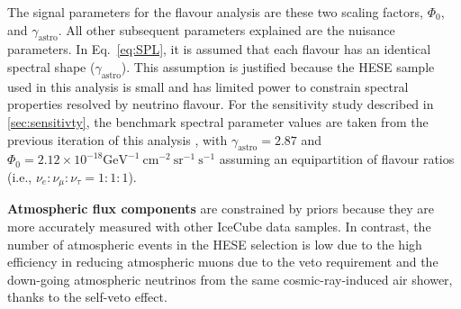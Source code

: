 The signal parameters for the flavour analysis are these two scaling factors, $\Phi_{\mathrm{0}}$, and $\gamma_{\mathrm{astro}}$. All other subsequent parameters explained are the nuisance parameters. In Eq.~\ref{eq:SPL}, it is assumed that each flavour has an identical spectral shape ($\gamma_{\mathrm{astro}}$). This assumption is justified because the HESE sample used in this analysis is small and has limited power to constrain spectral properties resolved by neutrino flavour. For the sensitivity study described in \ref{sec:sensitivty}, the benchmark spectral parameter values are taken from the previous iteration of this analysis , with $\gamma_{\mathrm{astro}} = 2.87$ and $\Phi_{\mathrm{0}} = 2.12 \times 10^{-18} \mathrm{GeV}^{-1}\ \mathrm{cm}^{-2}\ \mathrm{sr}^{-1}\ \mathrm{s}^{-1}$ assuming an equipartition of flavour ratios (i.e., $\nu_e : \nu_{\mu} : \nu_{\tau} = 1:1:1$).

\textbf{Atmospheric flux components} are constrained by priors because they are more accurately measured with other IceCube data samples. In contrast, the number of atmospheric events in the HESE selection is low due to the high efficiency in reducing atmospheric muons due to the veto requirement and the down-going atmospheric neutrinos from the same cosmic-ray-induced air shower, thanks to the self-veto effect.

